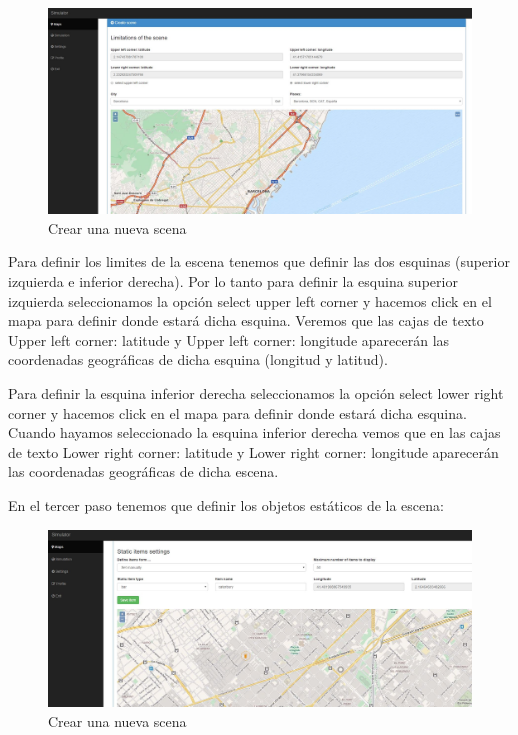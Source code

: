 \begin{figure}[H]
	\centering\includegraphics[scale=0.25]{imagenes/capitulo9/crear-escena-2.jpg}
	\caption{Crear una nueva scena}
	\label{img:AddScena2}
\end{figure}

Para definir los limites de la escena tenemos que definir las dos esquinas (superior izquierda e inferior derecha). Por lo tanto para definir la esquina superior izquierda seleccionamos la opción select upper left corner y hacemos click en el mapa para definir donde estará dicha esquina. Veremos que las cajas de texto Upper left corner: latitude y Upper left corner: longitude aparecerán las coordenadas geográficas de dicha esquina (longitud y latitud).

Para definir la esquina inferior derecha seleccionamos la opción select lower right corner y hacemos click en el mapa para definir donde estará dicha esquina. Cuando hayamos seleccionado la esquina inferior derecha vemos que en las cajas de texto Lower right corner: latitude y Lower right corner: longitude aparecerán las coordenadas geográficas de dicha escena.

En el tercer paso tenemos que definir los objetos estáticos de la escena:

\begin{figure}[H]
	\centering\includegraphics[scale=0.25]{imagenes/capitulo9/crear-escena-3-1.jpg}
	\caption{Crear una nueva scena}
	\label{img:AddScena31}
\end{figure}

